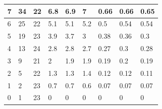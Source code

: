\documentclass{article}
\begin{document}
\begin{table}[!ht]
\begin{tabular}{|l|l|l|l|l|l|l|l|l|}
7                        & 34                   & 22                 & 6.8             & 6.9             & 7              & 0.66           & 0.66         & 0.65         \\ \hline
6                        & 25                   & 22                 & 5.1             & 5.1             & 5.2            & 0.5            & 0.54         & 0.54         \\ \hline
5                        & 19                   & 23                 & 3.9             & 3.7             & 3              & 0.38           & 0.36         & 0.3          \\ \hline
4                        & 13                   & 24                 & 2.8             & 2.8             & 2.7            & 0.27           & 0.3          & 0.28         \\ \hline
3                        & 9                    & 21                 & 2               & 1.9             & 1.9            & 0.19           & 0.2          & 0.19         \\ \hline
2                        & 5                    & 22                 & 1.3             & 1.3             & 1.4            & 0.12           & 0.12         & 0.11         \\ \hline
1                        & 2                    & 23                 & 0.7             & 0.7             & 0.6            & 0.07           & 0.07         & 0.07         \\ \hline
0                        & 1                    & 23                 & 0               & 0               & 0              & 0              & 0            & 0            \\ \hline
\end{tabular}
\end{table}
\end{document}
